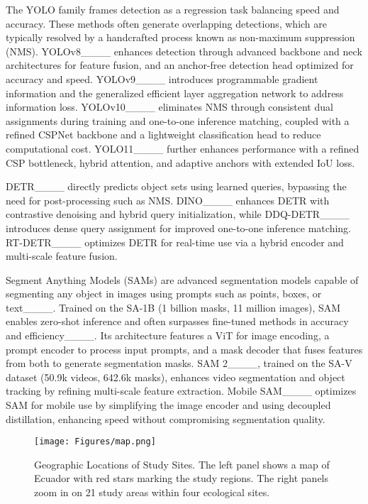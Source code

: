 The YOLO family frames detection as a regression task balancing speed and accuracy. These methods often generate overlapping detections, which are typically resolved by a handcrafted process known as non-maximum suppression (NMS). YOLOv8____ enhances detection through advanced backbone and neck architectures for feature fusion, and an anchor-free detection head optimized for accuracy and speed. YOLOv9____ introduces programmable gradient information and the generalized efficient layer aggregation network to address information loss. YOLOv10____ eliminates NMS through consistent dual assignments during training and one-to-one inference matching, coupled with a refined CSPNet backbone and a lightweight classification head to reduce computational cost. YOLO11____ further enhances performance with a refined CSP bottleneck, hybrid attention, and adaptive anchors with extended IoU loss.

DETR____ directly predicts object sets using learned queries, bypassing the need for post-processing such as NMS. DINO____ enhances DETR with contrastive denoising and hybrid query initialization, while DDQ-DETR____ introduces dense query assignment for improved one-to-one inference matching. RT-DETR____ optimizes DETR for real-time use via a hybrid encoder and multi-scale feature fusion.


Segment Anything Models (SAMs) are advanced segmentation models capable of segmenting any object in images using prompts such as points, boxes, or text____. Trained on the SA-1B (1 billion masks, 11 million images), SAM enables zero-shot inference and often surpasses fine-tuned methods in accuracy and efficiency____. Its architecture features a ViT for image encoding, a prompt encoder to process input prompts, and a mask decoder that fuses features from both to generate segmentation masks. SAM 2____, trained on the SA-V dataset (50.9k videos, 642.6k masks), enhances video segmentation and object tracking by refining multi-scale feature extraction. Mobile SAM____ optimizes SAM for mobile use by simplifying the image encoder and using decoupled distillation, enhancing speed without compromising segmentation quality.

\begin{figure}
    \centering
    \texttt{[image: Figures/map.png]}
    \caption{Geographic Locations of Study Sites. The left panel shows a map of Ecuador with red stars marking the study regions. The right panels zoom in on 21 study areas within four ecological sites.}
    \label{fig:map}
\end{figure}